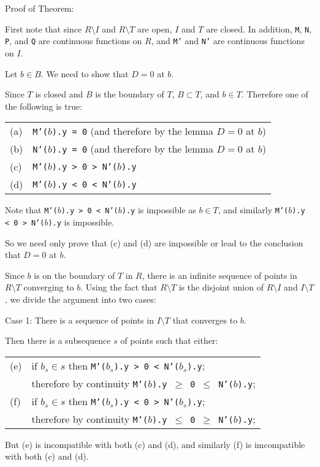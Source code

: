 \documentclass[12pt]{article}
\begin{document}
\begin{indpar}{0.3in}
Proof of Theorem:

First note that since $R\setminus I$ and $R\setminus T$ are open,
$I$ and $T$ are closed.  In addition, {\tt M}, {\tt N}, {\tt P},
and {\tt Q} are continuous functions on $R$, and {\tt M'} and {\tt N'}
are continuous functions on $I$.

Let $b\in B$.  We need to show that $D=0$ at $b$.

Since $T$ is closed and $B$ is the boundary of $T$, $B\subset T$,
and $b\in T$.  Therefore one of the following is true:
\begin{center}
\begin{tabular}{ll}
(a) & {\tt M'($b$).y = 0} (and therefore by the lemma $D=0$ at $b$) \\ 
(b) & {\tt N'($b$).y = 0} (and therefore by the lemma $D=0$ at $b$) \\ 
(c) & {\tt M'($b$).y > 0 > N'($b$).y} \\
(d) & {\tt M'($b$).y < 0 < N'($b$).y} \\
\end{tabular}
\end{center}
Note that {\tt M'($b$).y > 0 < N'($b$).y}
is impossible as $b\in T$,
and similarly {\tt M'($b$).y < 0 > N'($b$).y} is impossible.

So we need only prove that (c) and (d) are impossible or lead
to the conclusion that $D=0$ at $b$.

Since $b$ is on the boundary of $T$ in $R$,
there is an infinite sequence of points in $R\setminus T$
converging to $b$.  Using the fact that $R\setminus T$ is the
disjoint union of $R\setminus I$ and $I\setminus T$,
we divide the argument into two cases:

Case 1: There is a sequence of points in $I\setminus T$ that
converges to $b$.

Then there is a subsequence $s$ of points such that either:
\begin{center}
\begin{tabular}{ll}
(e) & if $b_s\in s$ then {\tt M'($b_s$).y > 0 < N'($b_s$).y}; \\
    & therefore by continuity
            {\tt M'($b$).y $\geq$ 0 $\leq$ N'($b$).y}; \\
(f) & if $b_s\in s$ then {\tt M'($b_s$).y < 0 > N'($b_s$).y}; \\
    & therefore by continuity
            {\tt M'($b$).y $\leq$ 0 $\geq$ N'($b$).y}; \\
\end{tabular}
\end{center}
But (e) is incompatible with both (c) and (d), and similarly (f) is
imcompatible with both (c) and (d).


\end{indpar}
\end{document}
